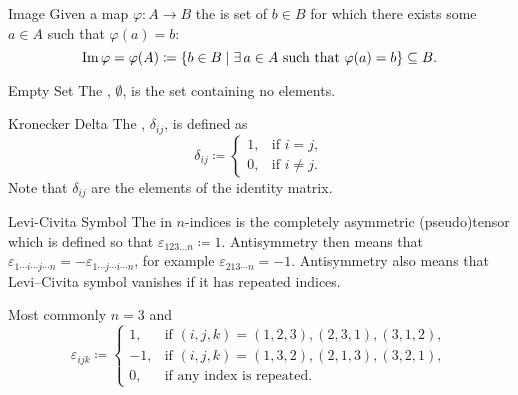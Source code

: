 \begin{dfn}{Image}{}
    Given a map \(\varphi \colon A \to B\) the  is set of \(b \in B\) for which there exists some \(a \in A\) such that \(\varphi(a) = b\):
    \begin{equation}
        \operatorname{Im}\varphi = \varphi(A) \coloneqq \{b \in B \mid \exists \, a \in A \text{ such that } \varphi(a) = b\} \subseteq B.
    \end{equation}
\end{dfn}

\begin{dfn}{Empty Set}{}
    The , \(\emptyset\), is the set containing no elements.
\end{dfn}

\begin{dfn}{Kronecker Delta}{}
    The , \(\delta_{ij}\), is defined as
    \begin{equation}
        \delta_{ij} \coloneqq
        \begin{cases}
            1, & \text{if } i = j,\\
            0, & \text{if } i \ne j.
        \end{cases}
    \end{equation}
    Note that \(\delta_{ij}\) are the elements of the identity matrix.
\end{dfn}

\begin{dfn}{Levi-Civita Symbol}{}
    The  in \(n\)-indices is the completely asymmetric (pseudo)tensor which is defined so that \(\varepsilon_{123\dotso n} \coloneqq 1\).
    Antisymmetry then means that \(\varepsilon_{1\dotsm i\dotsm j \dotsm n} = -\varepsilon_{1\dotsm j\dotsm i\dotsm n}\), for example \(\varepsilon_{213\dotsm n} = -1\).
    Antisymmetry also means that Levi--Civita symbol vanishes if it has repeated indices.
    
    Most commonly \(n = 3\) and
    \begin{equation}
        \varepsilon_{ijk} \coloneqq 
        \begin{cases}
            1, & \text{if } (i, j, k) = (1, 2, 3), (2, 3, 1), (3, 1, 2),\\
            -1, & \text{if } (i, j, k) = (1, 3, 2), (2, 1, 3), (3, 2, 1),\\
            0, & \text{if any index is repeated}.
        \end{cases}
    \end{equation}
\end{dfn}

